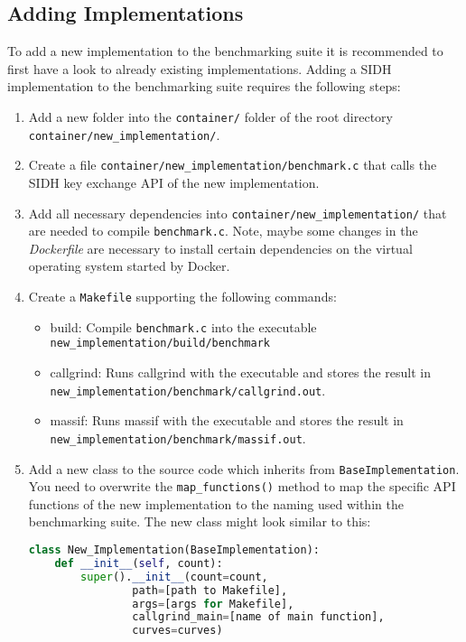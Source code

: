 \subsection{Adding Implementations}
To add a new implementation to the benchmarking suite it is recommended to first have a look to already existing implementations. Adding a SIDH implementation to the benchmarking suite requires the following steps:
\begin{enumerate}
\itemsep0em 
\item Add a new folder into the \texttt{container/} folder of the root directory \\ \texttt{container/new\_implementation/}.
\item Create a file \texttt{container/new\_implementation/benchmark.c} that calls the SIDH key exchange API of the new implementation.
\item Add all necessary dependencies into \texttt{container/new\_implementation/} that are needed to compile \texttt{benchmark.c}. Note, maybe some changes in the \textit{Dockerfile} are necessary to install certain dependencies on the virtual operating system started by Docker.
\item Create a \texttt{Makefile} supporting the following commands:
	\begin{itemize}
		\item build: Compile \texttt{benchmark.c} into the executable \\ \texttt{new\_implementation/build/benchmark}
		\item callgrind: Runs callgrind with the executable and stores the result in\\ \texttt{new\_implementation/benchmark/callgrind.out}.
		\item massif: Runs massif with the executable and stores the result in\\ \texttt{new\_implementation/benchmark/massif.out}.
	\end{itemize}
\item Add a new class to the source code which inherits from \texttt{BaseImplementation}. You need to overwrite the \texttt{map\_functions()} method to map the specific API functions of the new implementation to the naming used within the benchmarking suite. The new class might look similar to this:

\begin{lstlisting}[language=Python]
class New_Implementation(BaseImplementation):
    def __init__(self, count):
        super().__init__(count=count,
				path=[path to Makefile], 
				args=[args for Makefile],
				callgrind_main=[name of main function],
				curves=curves)


\end{lstlisting}
\end{enumerate}
